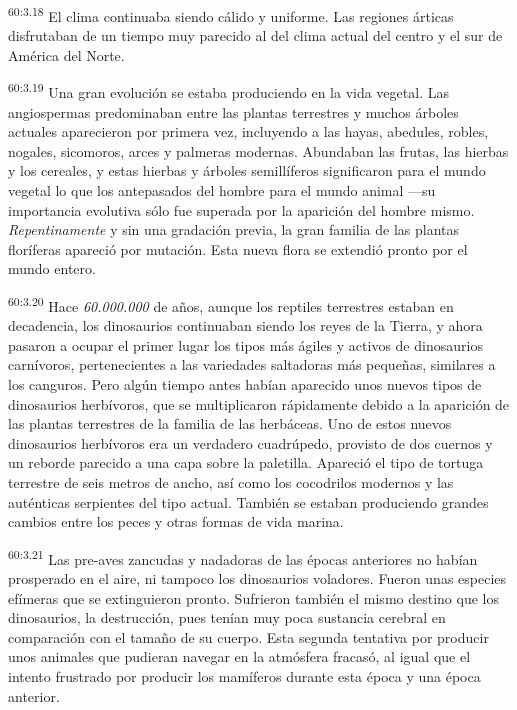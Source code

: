 \par
\textsuperscript{60:3.18} El clima continuaba siendo cálido y uniforme. Las regiones árticas disfrutaban de un tiempo muy parecido al del clima actual del centro y el sur de América del Norte.

\par
\textsuperscript{60:3.19} Una gran evolución se estaba produciendo en la vida vegetal. Las angiospermas predominaban entre las plantas terrestres y muchos árboles actuales aparecieron por primera vez, incluyendo a las hayas, abedules, robles, nogales, sicomoros, arces y palmeras modernas. Abundaban las frutas, las hierbas y los cereales, y estas hierbas y árboles semillíferos significaron para el mundo vegetal lo que los antepasados del hombre para el mundo animal ---su importancia evolutiva sólo fue superada por la aparición del hombre mismo. \textit{Repentinamente} y sin una gradación previa, la gran familia de las plantas floríferas apareció por mutación. Esta nueva flora se extendió pronto por el mundo entero.

\par
\textsuperscript{60:3.20} Hace \textit{60.000.000} de años, aunque los reptiles terrestres estaban en decadencia, los dinosaurios continuaban siendo los reyes de la Tierra, y ahora pasaron a ocupar el primer lugar los tipos más ágiles y activos de dinosaurios carnívoros, pertenecientes a las variedades saltadoras más pequeñas, similares a los canguros. Pero algún tiempo antes habían aparecido unos nuevos tipos de dinosaurios herbívoros, que se multiplicaron rápidamente debido a la aparición de las plantas terrestres de la familia de las herbáceas. Uno de estos nuevos dinosaurios herbívoros era un verdadero cuadrúpedo, provisto de dos cuernos y un reborde parecido a una capa sobre la paletilla. Apareció el tipo de tortuga terrestre de seis metros de ancho, así como los cocodrilos modernos y las auténticas serpientes del tipo actual. También se estaban produciendo grandes cambios entre los peces y otras formas de vida marina.

\par
\textsuperscript{60:3.21} Las pre-aves zancudas y nadadoras de las épocas anteriores no habían prosperado en el aire, ni tampoco los dinosaurios voladores. Fueron unas especies efímeras que se extinguieron pronto. Sufrieron también el mismo destino que los dinosaurios, la destrucción, pues tenían muy poca sustancia cerebral en comparación con el tamaño de su cuerpo. Esta segunda tentativa por producir unos animales que pudieran navegar en la atmósfera fracasó, al igual que el intento frustrado por producir los mamíferos durante esta época y una época anterior.

